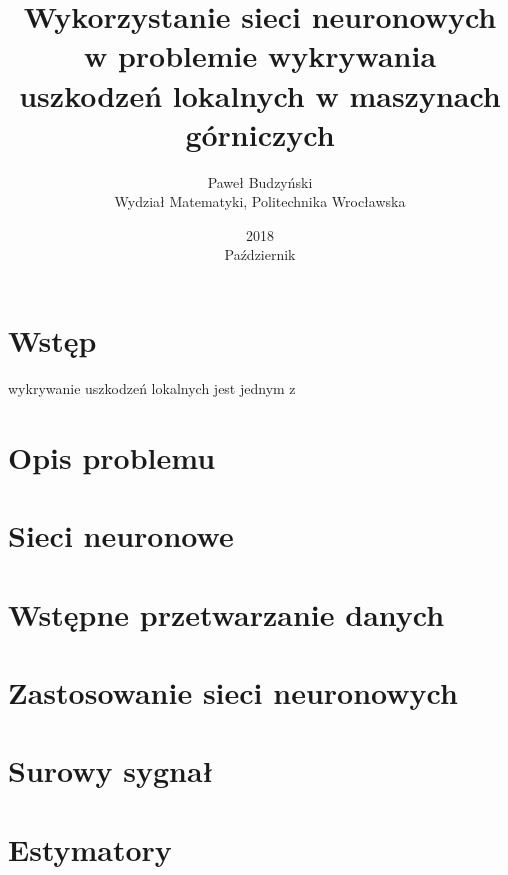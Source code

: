 \documentclass[12pt, a4paper, oneside, draft]{article}
\author{Paweł Budzyński \\ Wydział Matematyki, Politechnika Wrocławska}
\title{\textbf{Wykorzystanie sieci neuronowych w problemie wykrywania uszkodzeń lokalnych w maszynach górniczych}}
\date{2018 \\ Październik}
\newcommand{\mychapter}[2]{
	\setcounter{chapter}{#1}
	\setcounter{section}{0}
	\chapter*{#2}
	\addcontentsline{toc}{chapter}{#2}
}
\begin{document}
	\maketitle
	\section{Wstęp}
	wykrywanie uszkodzeń lokalnych jest jednym z \cite{Zimroz01}
	\section{Opis problemu}
	\section{Sieci neuronowe}
	
	
	
	\section{Wstępne przetwarzanie danych}
	\cite{Python}
	\section{Zastosowanie sieci neuronowych}
	\cite{Wylomanska01}
	
	
	
	
	\section{Surowy sygnał}
	
	\section{Estymatory}
	
	
	
	
	\begin{center}
	\end{center}
	
	
	
\end{document}
